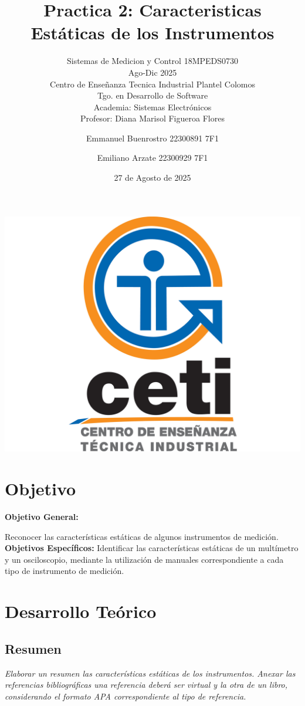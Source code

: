 \documentclass[11pt]{scrartcl}
\title {Practica 2: Caracteristicas Estáticas de los Instrumentos}
\subtitle{Sistemas de Medicion y Control 18MPEDS0730 \\ Ago-Dic 2025 \\ Centro de Enseñanza Tecnica Industrial Plantel Colomos\\Tgo. en Desarrollo de Software \\ Academia: Sistemas Electrónicos\\Profesor: Diana Marisol Figueroa Flores }
\date{27 de Agosto de 2025}
\author{Emmanuel Buenrostro 22300891 7F1 \\ \and Emiliano Arzate 22300929 7F1 \\}
\newcommand{\indicacion}[1]{\noindent\textit{\small #1}}
\begin{document}
\maketitle
\begin{center}
   \includegraphics[scale=0.15]{../../cetilogo.jpg} 
\end{center}
\newpage


\section{Objetivo}

\textbf{Objetivo General:}

Reconocer las características estáticas de algunos instrumentos de medición.
\\


\textbf{Objetivos Específicos:} 
Identificar las características estáticas de un multímetro y un osciloscopio, mediante la utilización de manuales correspondiente a cada tipo de instrumento de medición.


\section{Desarrollo Teórico}

\subsection{Resumen }

\indicacion{
    Elaborar un resumen las características estáticas de los instrumentos. Anexar las referencias bibliográficas una referencia deberá ser virtual y la otra de un libro, considerando el formato APA correspondiente al tipo de referencia.}
\end{document}
